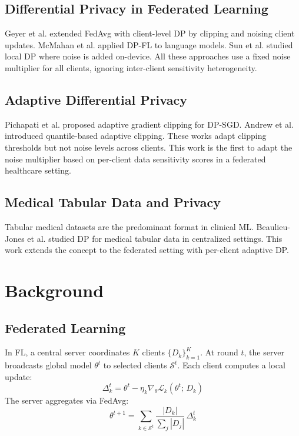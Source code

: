 \documentclass[journal]{IEEEtran}
\begin{document}
\subsection{Differential Privacy in Federated Learning}
Geyer et al. \cite{geyer2017} extended FedAvg with client-level DP by clipping
and noising client updates. McMahan et al. \cite{mcmahan2018} applied DP-FL to
language models. Sun et al. \cite{sun2021} studied local DP where noise is
added on-device. All these approaches use a fixed noise multiplier for all
clients, ignoring inter-client sensitivity heterogeneity.

\subsection{Adaptive Differential Privacy}
Pichapati et al. \cite{pichapati2019} proposed adaptive gradient clipping for
DP-SGD. Andrew et al. \cite{andrew2021} introduced quantile-based adaptive
clipping. These works adapt clipping thresholds but not noise levels across
clients. This work is the first to adapt the noise multiplier based on
per-client data sensitivity scores in a federated healthcare setting.

\subsection{Medical Tabular Data and Privacy}
Tabular medical datasets \cite{detrano1989,smith1988,johnson2016} are the
predominant format in clinical ML. Beaulieu-Jones et al. \cite{beaulieu2019}
studied DP for medical tabular data in centralized settings. This work extends
the concept to the federated setting with per-client adaptive DP.

\section{Background}
\label{sec:background}

\subsection{Federated Learning}
In FL, a central server coordinates $K$ clients $\{D_k\}_{k=1}^{K}$. At round
$t$, the server broadcasts global model $\theta^t$ to selected clients
$\mathcal{S}^t$. Each client computes a local update:
\begin{equation}
  \Delta_k^t = \theta^t - \eta_k \nabla_\theta \mathcal{L}_k(\theta^t;\,D_k)
  \label{eq:local}
\end{equation}
The server aggregates via FedAvg:
\begin{equation}
  \theta^{t+1} = \sum_{k \in \mathcal{S}^t}
  \frac{|D_k|}{\sum_j |D_j|}\,\Delta_k^t
  \label{eq:fedavg}
\end{equation}
\end{document}
